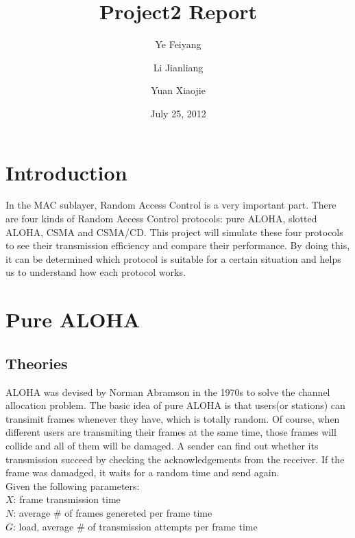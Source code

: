 \documentclass[11pt,a4paper]{report}
\begin{document}
\title{Project2 Report}

\author{Ye Feiyang \and Li Jianliang \and Yuan Xiaojie}

\date{July 25, 2012}

\maketitle

\section*{Introduction}
In the MAC sublayer, Random Access Control is a very important part. There are four kinds of Random Access Control protocols: pure ALOHA, slotted ALOHA, CSMA and CSMA/CD. This project will simulate these four protocols to see their transmission efficiency and compare their performance. By doing this, it can be determined which protocol is suitable for a certain situation and helps us to understand how each protocol works.

\section*{Pure ALOHA}
\subsection*{Theories}
ALOHA was devised by Norman Abramson in the 1970s to solve the channel allocation problem. The basic idea of pure ALOHA is that users(or stations) can transimit frames whenever they have, which is totally random. Of course, when different users are transmiting their frames at the same time, those frames will collide and all of them will be damaged. A sender can find out whether its transmission succeed by checking the acknowledgements from the receiver. If the frame was damadged, it waits for a random time and send again. \\

Given the following parameters: \\

\qquad	\(X\): frame transmission time \\

\qquad	\(N\): average \# of frames genereted per frame time \\

\qquad	\(G\): load, average \# of transmission attempts per frame time \\
\end{document}
